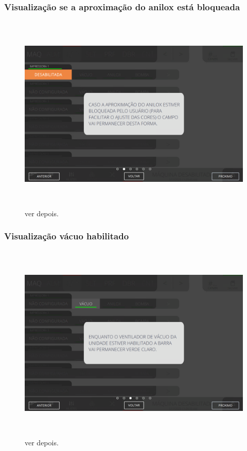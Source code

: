 \newpage
\thispagestyle{fancy}
\vspace*{\fill}
\subsubsection{\small{Visualização se a aproximação do anilox está bloqueada}}
\begin{figure}[h]
  \centering
  \includegraphics[width=576px,height=360px]{src/images/04-printter/01-printters/commands/e-2.png}
  \caption{ver depois.}
   \label{}
\end{figure}
\vspace*{\fill}

\newpage
\thispagestyle{fancy}
\vspace*{\fill}
\subsubsection{\small{Visualização vácuo habilitado}}
\begin{figure}[h]
  \centering
  \includegraphics[width=576px,height=360px]{src/images/04-printter/01-printters/commands/e-3.png}
  \caption{ver depois.}
   \label{}
\end{figure}
\vspace*{\fill}

